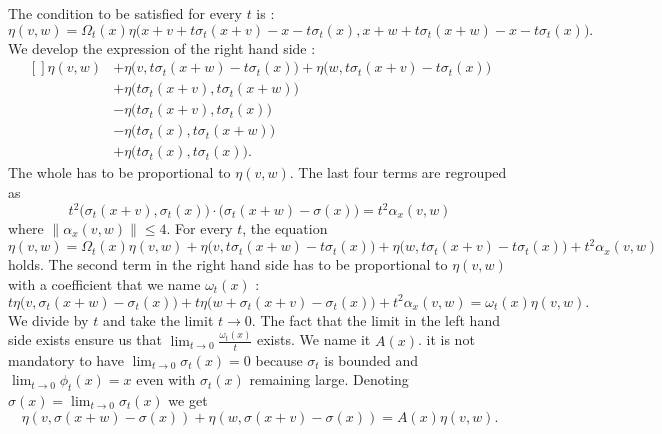 The condition to be satisfied for every \( t\) is :
\begin{equation}        \label{EQooNQOAooALfgJc}
    \eta(v,w)=\Omega_t(x)\eta\Big(   x+v+t\sigma_t(x+v)-x-t\sigma_t(x),x+w+t\sigma_t(x+w)-x-t\sigma_t(x)    \Big).
\end{equation}
We develop the expression of the right hand side :
\begin{equation}
    \begin{aligned}[]
        \eta(v,w)&+\eta\big( v,t\sigma_t(x+w)-t\sigma_t(x) \big)+\eta\big( w,t\sigma_t(x+v)-t\sigma_t(x) \big)\\
        &+\eta\big( t\sigma_t(x+v),t\sigma_t(x+w) \big)\\
        &-\eta\big( t\sigma_t(x+v),t\sigma_t(x) \big)\\
        &-\eta\big( t\sigma_t(x),t\sigma_t(x+w) \big)\\
        &+\eta\big( t\sigma_t(x),t\sigma_t(x) \big).
    \end{aligned}
\end{equation}
The whole has to be proportional to \( \eta(v,w)\). The last four terms are regrouped as
\begin{equation}
    t^2\big( \sigma_t(x+v),\sigma_t(x) \big)\cdot \big( \sigma_t(x+w)-\sigma(x) \big)=t^2\alpha_x(v,w)
\end{equation}
where \( \| \alpha_x(v,w) \|\leq 4\). For every \( t\), the equation
\begin{equation}
        \eta(v,w)=\Omega_t(x)\eta(v,w)+\eta\big( v,t\sigma_t(x+w)-t\sigma_t(x) \big)+\eta\big( w,t\sigma_t(x+v)-t\sigma_t(x) \big)+t^2\alpha_x(v,w)
\end{equation}
holds. The second term in the right hand side has to be proportional to \( \eta(v,w)\) with a coefficient that we name \( \omega_t(x)\) :
\begin{equation}
    t\eta\big( v,\sigma_t(x+w)-\sigma_t(x) \big)+t\eta\big( w+\sigma_t(x+v)-\sigma_t(x) \big)+t^2\alpha_x(v,w)=\omega_t(x)\eta(v,w).
\end{equation}
We divide by \( t\) and take the limit \( t\to 0\). The fact that the limit in the left hand side exists ensure us that \( \lim_{t\to 0} \frac{ \omega_t(x) }{ t }\) exists. We name it \( A(x)\). it is not mandatory to have \( \lim_{t\to 0} \sigma_t(x)=0\) because \( \sigma_t\) is bounded and \( \lim_{t\to 0} \phi_t(x)=x\) even with \(\sigma_t(x)\) remaining large. Denoting \( \sigma(x)=\lim_{t\to 0} \sigma_t(x)\) we get
\begin{equation}        \label{EQooLBWNooRbaXzL}
    \eta(v,\sigma(x+w)-\sigma(x))+\eta(w,\sigma(x+v)-\sigma(x))=A(x)\eta(v,w).
\end{equation}

